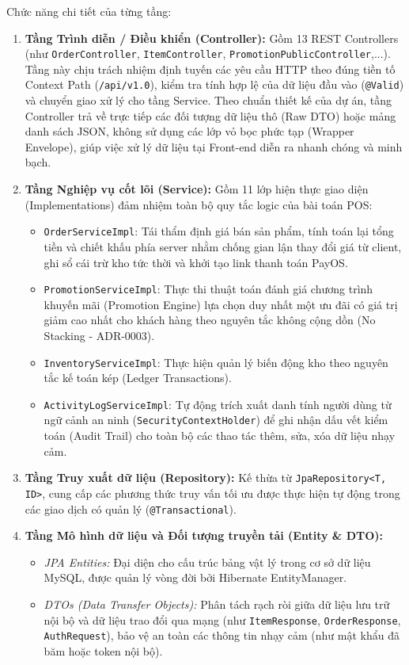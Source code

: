 Chức năng chi tiết của từng tầng:
\begin{enumerate}[label=\arabic*., leftmargin=1.5cm]
    \item \textbf{Tầng Trình diễn / Điều khiển (Controller):} Gồm 13 REST Controllers (như \texttt{OrderController}, \texttt{ItemController}, \texttt{PromotionPublicController},...). Tầng này chịu trách nhiệm định tuyến các yêu cầu HTTP theo đúng tiền tố Context Path (\texttt{/api/v1.0}), kiểm tra tính hợp lệ của dữ liệu đầu vào (\texttt{@Valid}) và chuyển giao xử lý cho tầng Service. Theo chuẩn thiết kế của dự án, tầng Controller trả về trực tiếp các đối tượng dữ liệu thô (Raw DTO) hoặc mảng danh sách JSON, không sử dụng các lớp vỏ bọc phức tạp (Wrapper Envelope), giúp việc xử lý dữ liệu tại Front-end diễn ra nhanh chóng và minh bạch.
    \item \textbf{Tầng Nghiệp vụ cốt lõi (Service):} Gồm 11 lớp hiện thực giao diện (Implementations) đảm nhiệm toàn bộ quy tắc logic của bài toán POS:
    \begin{itemize}
        \item \texttt{OrderServiceImpl}: Tái thẩm định giá bán sản phẩm, tính toán lại tổng tiền và chiết khấu phía server nhằm chống gian lận thay đổi giá từ client, ghi sổ cái trừ kho tức thời và khởi tạo link thanh toán PayOS.
        \item \texttt{PromotionServiceImpl}: Thực thi thuật toán đánh giá chương trình khuyến mãi (Promotion Engine) lựa chọn duy nhất một ưu đãi có giá trị giảm cao nhất cho khách hàng theo nguyên tắc không cộng dồn (No Stacking - ADR-0003).
        \item \texttt{InventoryServiceImpl}: Thực hiện quản lý biến động kho theo nguyên tắc kế toán kép (Ledger Transactions).
        \item \texttt{ActivityLogServiceImpl}: Tự động trích xuất danh tính người dùng từ ngữ cảnh an ninh (\texttt{SecurityContextHolder}) để ghi nhận dấu vết kiểm toán (Audit Trail) cho toàn bộ các thao tác thêm, sửa, xóa dữ liệu nhạy cảm.
    \end{itemize}
    \item \textbf{Tầng Truy xuất dữ liệu (Repository):} Kế thừa từ \texttt{JpaRepository<T, ID>}, cung cấp các phương thức truy vấn tối ưu được thực hiện tự động trong các giao dịch có quản lý (\texttt{@Transactional}).
    \item \textbf{Tầng Mô hình dữ liệu và Đối tượng truyền tải (Entity \& DTO):}
    \begin{itemize}
        \item \textit{JPA Entities:} Đại diện cho cấu trúc bảng vật lý trong cơ sở dữ liệu MySQL, được quản lý vòng đời bởi Hibernate EntityManager.
        \item \textit{DTOs (Data Transfer Objects):} Phân tách rạch ròi giữa dữ liệu lưu trữ nội bộ và dữ liệu trao đổi qua mạng (như \texttt{ItemResponse}, \texttt{OrderResponse}, \texttt{AuthRequest}), bảo vệ an toàn các thông tin nhạy cảm (như mật khẩu đã băm hoặc token nội bộ).
    \end{itemize}
\end{enumerate}

